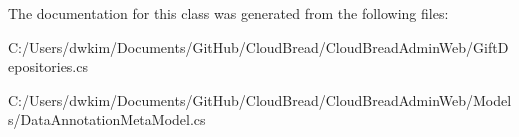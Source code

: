 The documentation for this class was generated from the following files\+:\begin{DoxyCompactItemize}
\item 
C\+:/\+Users/dwkim/\+Documents/\+Git\+Hub/\+Cloud\+Bread/\+Cloud\+Bread\+Admin\+Web/Gift\+Depositories.\+cs\item 
C\+:/\+Users/dwkim/\+Documents/\+Git\+Hub/\+Cloud\+Bread/\+Cloud\+Bread\+Admin\+Web/\+Models/Data\+Annotation\+Meta\+Model.\+cs\end{DoxyCompactItemize}
